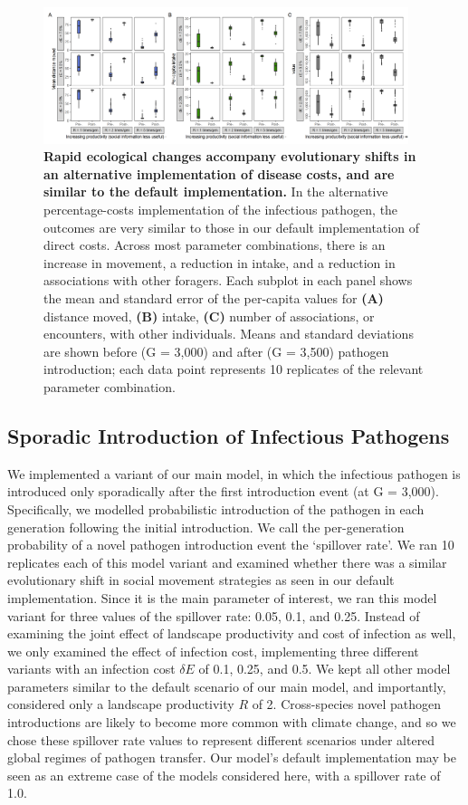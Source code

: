 \begin{figure}
    \centering
    \includegraphics[width=0.95\textwidth]{figures/pathomove/fig_eco_compare_percent.png}
    \caption{
        \textbf{Rapid ecological changes accompany evolutionary shifts in an alternative implementation of disease costs, and are similar to the default implementation.} In the alternative percentage-costs implementation of the infectious pathogen, the outcomes are very similar to those in our default implementation of direct costs. Across most parameter combinations, there is an increase in movement, a reduction in intake, and a reduction in associations with other foragers. Each subplot in each panel shows the mean and standard error of the per-capita values for \textbf{(A)} distance moved, \textbf{(B)} intake, \textbf{(C)} number of associations, or encounters, with other individuals. Means and standard deviations are shown before (G = 3,000) and after (G = 3,500) pathogen introduction; each data point represents 10 replicates of the relevant parameter combination.
    }
\end{figure}

\subsection*{Sporadic Introduction of Infectious Pathogens}

We implemented a variant of our main model, in which the infectious pathogen is introduced only sporadically after the first introduction event (at G = 3,000).
Specifically, we modelled probabilistic introduction of the pathogen in each generation following the initial introduction.
We call the per-generation probability of a novel pathogen introduction event the `spillover rate'.
We ran 10 replicates each of this model variant and examined whether there was a similar evolutionary shift in social movement strategies as seen in our default implementation.
Since it is the main parameter of interest, we ran this model variant for three values of the spillover rate: 0.05, 0.1, and 0.25.
Instead of examining the joint effect of landscape productivity and cost of infection as well, we only examined the effect of infection cost, implementing three different variants with an infection cost \(\delta E\) of 0.1, 0.25, and 0.5.
We kept all other model parameters similar to the default scenario of our main model, and importantly, considered only a landscape productivity \(R\) of 2.
Cross-species novel pathogen introductions are likely to become more common with climate change, and so we chose these spillover rate values to represent different scenarios under altered global regimes of pathogen transfer.
Our model's default implementation may be seen as an extreme case of the models considered here, with a spillover rate of 1.0.

